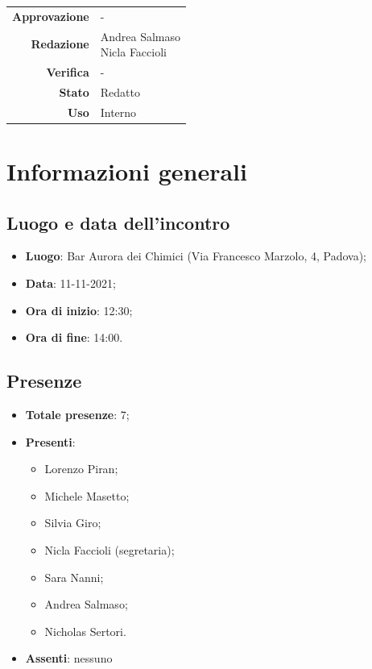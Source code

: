 \documentclass[11pt]{article}
\begin{document}
\begin{titlepage}
\begin{center}
			\large
			\begin{tabular}{r|l}
				\textbf{Approvazione} &  -\\
				\textbf{Redazione} &  \parbox[t]{5cm}{Andrea Salmaso \\Nicla Faccioli}\\
				\textbf{Verifica} &  -\\
				\textbf{Stato} & Redatto \\
				\textbf{Uso} & Interno
			\end{tabular}
			\vfill
			
		\end{center}
	\end{titlepage}
	
	\section{Informazioni generali}
	\subsection{Luogo e data dell'incontro}
	\begin{itemize}
		\item \textbf{Luogo}: Bar Aurora dei Chimici (Via Francesco Marzolo, 4, Padova);
		\item \textbf{Data}: 11-11-2021;
		\item \textbf{Ora di inizio}: 12:30;
		\item \textbf{Ora di fine}: 14:00.
	\end{itemize}
	
	\subsection{Presenze}
	\begin{itemize}
		\item \textbf{Totale presenze}: 7;
		\item \textbf{Presenti}:
		\begin{itemize}
			\item Lorenzo Piran; 
			\item Michele Masetto;
			\item Silvia Giro;
			\item Nicla Faccioli (segretaria);
			\item Sara Nanni;
			\item Andrea Salmaso;
			\item Nicholas Sertori.
		\end{itemize}
		\item \textbf{Assenti}: nessuno
	\end{itemize}
\end{document}
